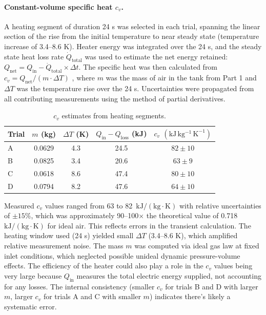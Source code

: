 \documentclass[12pt]{article}
\begin{document}
\paragraph{Constant-volume specific heat $c_v$.} A heating segment of duration 24 s was selected in each trial, spanning the linear section of the rise from the initial temperature to near steady state (temperature increase of 3.4–8.6 K). 
Heater energy was integrated over the 24 s, and the steady state heat loss rate $\dot{Q}_{\text{total}}$ was used to estimate the net energy retained: $Q_{\text{net}} = Q_{\text{in}} - \dot{Q}_{\text{total}} \times \Delta t$. 
The specific heat was then calculated from $c_v = Q_{\text{net}} / (m \cdot \Delta T)$ \cite{che260_manual}, where $m$ was the mass of air in the tank from Part 1 and $\Delta T$ was the temperature rise over the 24 s. Uncertainties were propagated from all contributing measurements using the method of partial derivatives.


\begin{table}[H]\centering
\begin{tabular}{@{}lcccc@{}}
\toprule
Trial & $m$ (kg) & $\Delta T$ (K) & $Q_{\text{in}}-Q_{\text{loss}}$ (kJ) & $c_v$ $(\mathrm{kJ\,kg^{-1}\,K^{-1}})$ \\
\midrule
A & 0.0629 & 4.3 & 24.5 & $82 \pm 10$ \\
B & 0.0825 & 3.4 & 20.6 & $63 \pm 9$ \\
C & 0.0618 & 8.6 & 47.4 & $80 \pm 10$ \\
D & 0.0794 & 8.2 & 47.6 & $64 \pm 10$ \\
\bottomrule
\end{tabular}
\caption{$c_v$ estimates from heating segments.}
\label{tab:cv}
\end{table}

Measured $c_v$ values ranged from 63 to 82~$\mathrm{kJ/(kg \cdot K)}$ with relative uncertainties of $\pm 15\%$, which was approximately 90--100$\times$ the theoretical value of 0.718~$\mathrm{kJ/(kg \cdot K)}$ for ideal air. 
This reflects errors in the transient calculation. The heating window used (24 s) yielded small $\Delta T$ (3.4--8.6 K), which amplified relative measurement noise. The mass $m$ was computed via ideal gas law at fixed inlet conditions, which neglected possible unideal dynamic pressure-volume effects. The efficiency of the heater could also play a role in the $c_v$ values being very large because $Q_{\text{in}}$ measures the total electric energy supplied, not accounting for any losses. 
The internal consistency (smaller $c_v$ for trials B and D with larger $m$, larger $c_v$ for trials A and C with smaller $m$) indicates there's likely a systematic error. 
\end{document}
